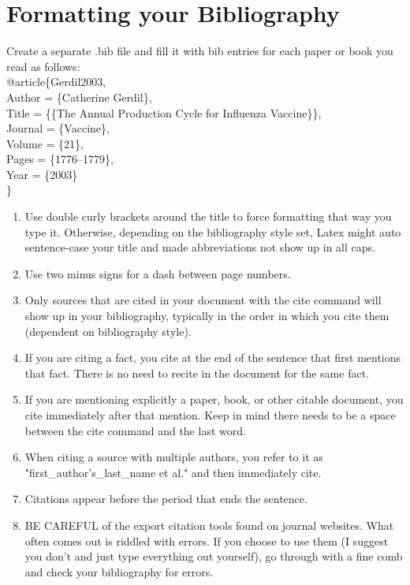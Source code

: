 \chapter{Formatting your Bibliography}\label{Ch:formatting_your_bibliography}

Create a separate .bib file and fill it with bib entries for each paper or book you read as follows:\\

\noindent @article\{Gerdil2003,\\
	Author = \{Catherine Gerdil\},\\
	Title = \{\{The Annual Production Cycle for Influenza Vaccine\}\},\\
	Journal = \{Vaccine\},\\
	Volume = \{21\},\\
	Pages = \{1776--1779\},\\
	Year = \{2003\}\\
	\}

\begin{enumerate}{}
\item Use double curly brackets around the title to force formatting that way you type it. Otherwise, depending on the bibliography style set, Latex might auto sentence-case your title and made abbreviations not show up in all caps. 
\item Use two minus signs for a dash between page numbers.
\item Only sources that are cited in your document with the cite command will show up in your bibliography, typically in the order in which you cite them (dependent on bibliography style).
\item If you are citing a fact, you cite at the end of the sentence that first mentions that fact. There is no need to recite in the document for the same fact.
\item If you are mentioning explicitly a paper, book, or other citable document, you cite immediately after that mention. Keep in mind there needs to be a space between the cite command and the last word. 
\item When citing a source with multiple authors, you refer to it as "first\_author's\_last\_name et al." and then immediately cite.
\item Citations appear before the period that ends the sentence. 
\item BE CAREFUL of the export citation tools found on journal websites. What often comes out is riddled with errors. If you choose to use them (I suggest you don't and just type everything out yourself), go through with a fine comb and check your bibliography for errors. 
\end{enumerate}


\endinput